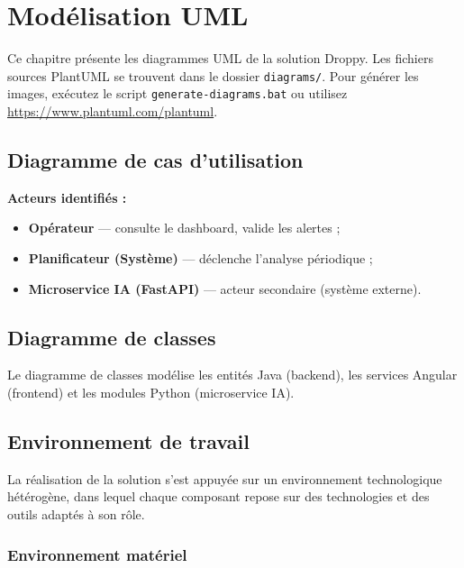 \chapter{Modélisation UML}

Ce chapitre présente les diagrammes UML de la solution Droppy. Les fichiers sources PlantUML se trouvent dans le dossier \texttt{diagrams/}. Pour générer les images, exécutez le script \texttt{generate-diagrams.bat} ou utilisez \url{https://www.plantuml.com/plantuml}.

\section{Diagramme de cas d'utilisation}

\textbf{Acteurs identifiés :}
\begin{itemize}
  \item \textbf{Opérateur} --- consulte le dashboard, valide les alertes ;
  \item \textbf{Planificateur (Système)} --- déclenche l'analyse périodique ;
  \item \textbf{Microservice IA (FastAPI)} --- acteur secondaire (système externe).
\end{itemize}


\section{Diagramme de classes}

Le diagramme de classes modélise les entités Java (backend), les services Angular (frontend) et les modules Python (microservice IA).


\section{Environnement de travail}

La réalisation de la solution \droppy{} s'est appuyée sur un environnement
technologique hétérogène, dans lequel chaque composant repose sur des
technologies et des outils adaptés à son rôle.

\subsection{Environnement matériel}

